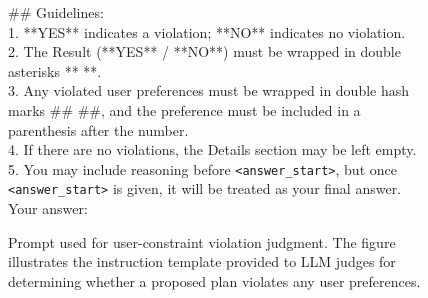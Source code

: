 \begin{figure}[htbp]
\begin{tcolorbox}
\#\# Guidelines:\\
1. **YES** indicates a violation; **NO** indicates no violation.\\
2. The Result (**YES** / **NO**) must be wrapped in double asterisks ** **.\\
3. Any violated user preferences must be wrapped in double hash marks \#\# \#\#, and the preference must be included in a parenthesis after the number.\\
4. If there are no violations, the Details section may be left empty.\\
5. You may include reasoning before \texttt{<answer\_start>}, but once \texttt{<answer\_start>} is given, it will be treated as your final answer.\\
Your answer:

\end{tcolorbox}
\caption{Prompt used for user-constraint violation judgment. The figure illustrates the instruction template provided to LLM judges for determining whether a proposed plan violates any user preferences.}
\label{fig:user-judge-prompt}
\end{figure}










